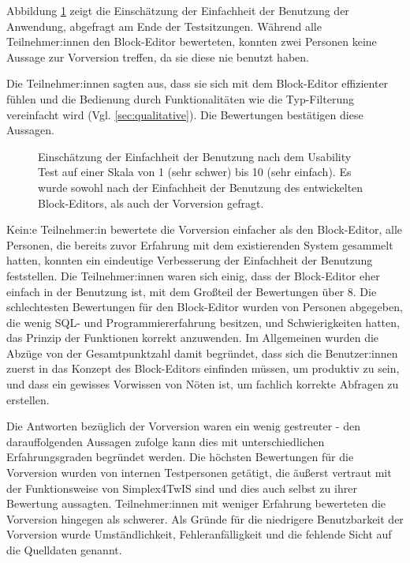 Abbildung \ref{fig:ges} zeigt die Einschätzung der Einfachheit der Benutzung der Anwendung, abgefragt am Ende der Testsitzungen. Während alle Teilnehmer:innen den Block-Editor bewerteten, konnten zwei Personen keine Aussage zur Vorversion treffen, da sie diese nie benutzt haben.

Die Teilnehmer:innen sagten aus, dass sie sich mit dem Block-Editor effizienter fühlen und die Bedienung durch Funktionalitäten wie die Typ-Filterung vereinfacht wird (Vgl. \ref{sec:qualitative}). Die Bewertungen bestätigen diese Aussagen.

\begin{figure}[!ht]
  \datatable
  \centering
  \caption[Einschätzung der Einfachheit der Benutzung nach dem Usability-Test]{Einschätzung der Einfachheit der Benutzung nach dem Usability
    Test auf einer Skala von 1 (sehr schwer) bis 10 (sehr einfach). Es wurde sowohl nach der Einfachheit der Benutzung des entwickelten Block-Editors, als auch der Vorversion gefragt.}
  \label{fig:ges}
\end{figure}

Kein:e Teilnehmer:in bewertete die Vorversion einfacher als den Block-Editor, alle Personen, die bereits zuvor Erfahrung mit dem existierenden System gesammelt hatten, konnten ein eindeutige Verbesserung der Einfachheit der Benutzung feststellen. Die Teilnehmer:innen waren sich einig, dass der Block-Editor eher einfach in der Benutzung ist, mit dem Großteil der Bewertungen über 8. Die schlechtesten Bewertungen für den Block-Editor wurden von Personen abgegeben, die wenig \ac{SQL}- und Programmiererfahrung besitzen, und Schwierigkeiten hatten, das Prinzip der Funktionen korrekt anzuwenden. Im Allgemeinen wurden die Abzüge von der Gesamtpunktzahl damit begründet, dass sich die Benutzer:innen zuerst in das Konzept des Block-Editors einfinden müssen, um produktiv zu sein, und dass ein gewisses Vorwissen von Nöten ist, um fachlich korrekte Abfragen zu erstellen.

Die Antworten bezüglich der Vorversion waren ein wenig gestreuter - den darauffolgenden Aussagen zufolge kann dies mit unterschiedlichen Erfahrungsgraden begründet werden. Die höchsten Bewertungen für die Vorversion wurden von internen Testpersonen getätigt, die äußerst vertraut mit der Funktionsweise von Simplex4TwIS sind und dies auch selbst zu ihrer Bewertung aussagten. Teilnehmer:innen mit weniger Erfahrung bewerteten die Vorversion hingegen als schwerer. Als Gründe für die niedrigere Benutzbarkeit der Vorversion wurde Umständlichkeit, Fehleranfälligkeit und die fehlende Sicht auf die Quelldaten genannt.

